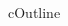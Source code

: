 \begin{myslide}{c}{Outline}

\begin{columns}

\begin{column}{0.75\textwidth}
\renewcommand{\baselinestretch}{1.25}\normalsize
\tableofcontents
\end{column}

\begin{column}{0.25\textwidth}
\centering
\myoutlineicon
\end{column}

\end{columns}

\end{myslide}
